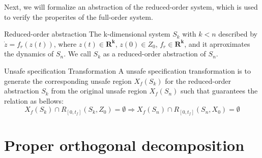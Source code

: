 \documentclass[runningheads,a4paper]{llncs}
\theoremstyle{definition}
\theoremstyle{plain}
\begin{document}
Next, we will formalize an abstraction of the reduced-order system, which is used to verify the properites of the full-order system.

\begin{definition}{Reduced-order abstraction}
The k-dimensional system $S_k$ with $k<n$ described by $\dot{z}=f_r (z(t))$, where $z(t) \in \mathbf{R^k}$, $z(0) \in Z_0$, $f_r \in \mathbf{R^k}$, and it aprroximates the dynamics of $S_n$. We call $S_k$ as a reduced-order abstraction of  $S_n$. 
\end{definition}
\begin{definition}{Unsafe specification Transformation}
A unsafe specification transformation is to generate the corresponding unsafe region $X_f(S_k)$ for the reduced-order abstraction $S_k$ from the original unsafe region $X_f(S_n)$ such that guarantees the relation as bellows:\\
\begin{equation}
X_f(S_k)\cap R_{[0,t_f]}(S_k,Z_0 )=\emptyset \Rightarrow  X_f(S_n) \cap R_{[0,t_f]}(S_n,X_0)=\emptyset  \label{Unsafe_Tran}
\end{equation}
\end{definition}
    
\section{Proper orthogonal decomposition} \label{POD}
\end{document}
